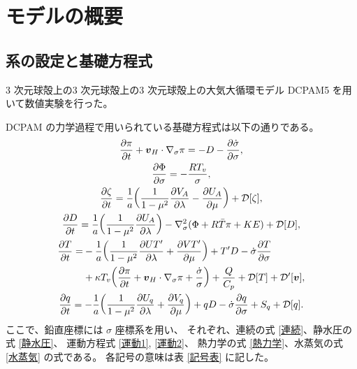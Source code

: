 \documentclass[body]{subfiles}
\begin{document}
\chapter{モデルの概要}\label{model}

\section{系の設定と基礎方程式}
3 次元球殻上の3 次元球殻上の3 次元球殻上の大気大循環モデル DCPAM5 を用いて数値実験を行った。

DCPAM の力学過程で用いられている基礎方程式は以下の通りである。
\begin{gather}
	\pdv{\pi}{t}+\vb*{v}_H\cdot\nabla_\sigma\pi=-D-\pdv{\dot \sigma}{\sigma},\label{連続}\\
	\pdv{\Phi}{\sigma}=-\frac{RT_v}{\sigma},\label{静水圧}\\
	\pdv{\zeta}{t}=\frac{1}{a}\qty(\frac{1}{1-\mu^2}\pdv{V_A}{\lambda}-\pdv{U_A}{\mu})+\mathcal{D}[\zeta],\label{運動1}\\
	\pdv{D}{t}=\frac{1}{a}\qty(\frac{1}{1-\mu^2}\pdv{U_A}{\lambda})
		-\nabla^2_\sigma(\Phi+R\bar T\pi+KE)+\mathcal{D}[D],\label{運動2}\\
	\begin{split}
		\pdv{T}{t}=&-\frac{1}{a}\qty(\frac{1}{1-\mu^2}\pdv{UT'}{\lambda}+\pdv{VT'}{\mu})+T'D-\dot\sigma\pdv{T}{\sigma}\\
		&+\kappa T_v\qty(\pdv{\pi}{t}+\vb*{v}_H\cdot\nabla_\sigma\pi+\frac{\dot\sigma}{\sigma})
			+\frac{Q}{C_p}+\mathcal{D}[T]+\mathcal{D}'[\vb*{v}],
	\end{split}\label{熱力学}\\
	\pdv{q}{t}=-\frac{1}{a}\qty(\frac{1}{1-\mu^2}\pdv{U_q}{\lambda}+\pdv{V_q}{\mu})
		+qD-\dot\sigma\pdv{q}{\sigma}+S_q+\mathcal{D}[q].\label{水蒸気}
\end{gather}
ここで、鉛直座標には \(\sigma\) 座標系を用い、
それぞれ、連続の式 \eqref{連続}、静水圧の式 \eqref{静水圧}、
運動方程式 \eqref{運動1}, \eqref{運動2}、
熱力学の式 \eqref{熱力学}、水蒸気の式 \eqref{水蒸気} の式である。
各記号の意味は表 \ref{記号表} に記した。
\end{document}
